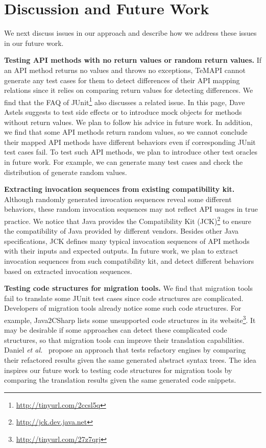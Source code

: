 

\section{Discussion and Future Work}
\label{sec:discuss}

We next discuss issues in our approach and describe how we address
these issues in our future work.

\textbf{Testing API methods with no return values or random return values.} If an API method returns no values and throws no exceptions, TeMAPI cannot generate any test cases for them to detect differences of their API mapping relations since it relies on comparing return values for detecting differences. We find that the FAQ of JUnit\footnote{\url{http://tinyurl.com/2ccsl5q}} also discusses a related issue. In this page, Dave Astels suggests to test side effects or to introduce mock objects for methods without return values. We plan to follow his advice in future work. In addition, we find that some API methods return random values, so we cannot conclude their mapped API methods have different behaviors even if corresponding JUnit test cases fail. To test such API methods, we plan to introduce other test oracles in future work. For example, we can generate many test cases and check the distribution of generate random values.

\textbf{Extracting invocation sequences from existing compatibility kit.} Although randomly generated invocation sequences reveal some different behaviors, these random invocation sequences may not reflect API usages in true practice. We notice that Java provides the Compatibility Kit (JCK)\footnote{\url{http://jck.dev.java.net}} to ensure the compatibility of Java provided by different vendors. Besides other Java specifications, JCK  defines many typical invocation sequences of API methods with their inputs and expected outputs. In future work, we plan to extract invocation sequences from such compatibility kit, and detect different behaviors based on extracted invocation sequences.

\textbf{Testing code structures for migration tools.} We find that migration tools fail to translate some JUnit test cases since code structures are complicated. Developers of migration tools already notice some such code structures. For example, Java2CSharp lists some unsupported code structures in its website\footnote{\url{http://tinyurl.com/27z7qrj}}. It may be desirable if some approaches can detect these complicated code structures, so that migration tools can improve their translation capabilities. Daniel \emph{et al.}~\cite{daniel2007automated} propose an approach that tests refactory engines by comparing their refactored results given the same generated abstract syntax trees. The idea inspires our future work to testing code structures for migration tools by comparing the translation results given the same generated code snippets. 